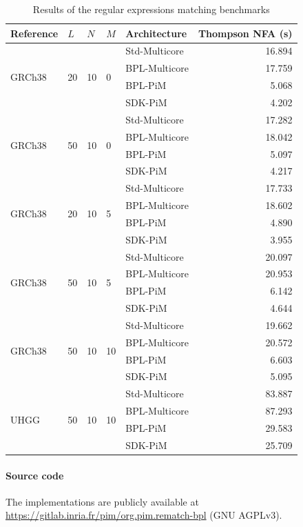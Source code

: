 \begin{table}
    \centering
    \caption{Results of the regular expressions matching benchmarks}
    \label{tab:rematch_results}
    \begin{tabular}{lllllr}
    \toprule
        Reference & $L$ & $N$ & $M$ & Architecture & Thompson NFA (s) \\

\midrule
\multirow{4}{*}{GRCh38} & \multirow{4}{*}{20} & \multirow{4}{*}{10} & \multirow{4}{*}{0} & Std-Multicore & 16.894 \\
&&&& BPL-Multicore & 17.759 \\
\arrayrulecolor{lightgray}\cmidrule{5-6}\arrayrulecolor{black}
&&&& BPL-PiM & 5.068 \\
&&&& SDK-PiM & 4.202 \\
\midrule
\multirow{4}{*}{GRCh38} & \multirow{4}{*}{50} & \multirow{4}{*}{10} & \multirow{4}{*}{0} & Std-Multicore & 17.282 \\
&&&& BPL-Multicore & 18.042 \\
\arrayrulecolor{lightgray}\cmidrule{5-6}\arrayrulecolor{black}
&&&& BPL-PiM & 5.097 \\
&&&& SDK-PiM & 4.217 \\
\midrule
\multirow{4}{*}{GRCh38} & \multirow{4}{*}{20} & \multirow{4}{*}{10} & \multirow{4}{*}{5} & Std-Multicore & 17.733 \\
&&&& BPL-Multicore & 18.602 \\
\arrayrulecolor{lightgray}\cmidrule{5-6}\arrayrulecolor{black}
&&&& BPL-PiM & 4.890 \\
&&&& SDK-PiM & 3.955 \\
\midrule
\multirow{4}{*}{GRCh38} & \multirow{4}{*}{50} & \multirow{4}{*}{10} & \multirow{4}{*}{5} & Std-Multicore & 20.097 \\
&&&& BPL-Multicore & 20.953 \\
\arrayrulecolor{lightgray}\cmidrule{5-6}\arrayrulecolor{black}
&&&& BPL-PiM & 6.142 \\
&&&& SDK-PiM & 4.644 \\
\midrule
\multirow{4}{*}{GRCh38} & \multirow{4}{*}{50} & \multirow{4}{*}{10} & \multirow{4}{*}{10} & Std-Multicore & 19.662 \\
&&&& BPL-Multicore & 20.572 \\
\arrayrulecolor{lightgray}\cmidrule{5-6}\arrayrulecolor{black}
&&&& BPL-PiM & 6.603 \\
&&&& SDK-PiM & 5.095 \\
\midrule
\multirow{4}{*}{UHGG} & \multirow{4}{*}{50} & \multirow{4}{*}{10} & \multirow{4}{*}{10} & Std-Multicore & 83.887 \\
&&&& BPL-Multicore & 87.293 \\
\arrayrulecolor{lightgray}\cmidrule{5-6}\arrayrulecolor{black}
&&&& BPL-PiM & 29.583 \\
&&&& SDK-PiM & 25.709 \\

    \bottomrule
    \end{tabular}
\end{table}

\paragraph{Source code} The implementations are publicly available at \url{https://gitlab.inria.fr/pim/org.pim.rematch-bpl} (GNU AGPLv3).